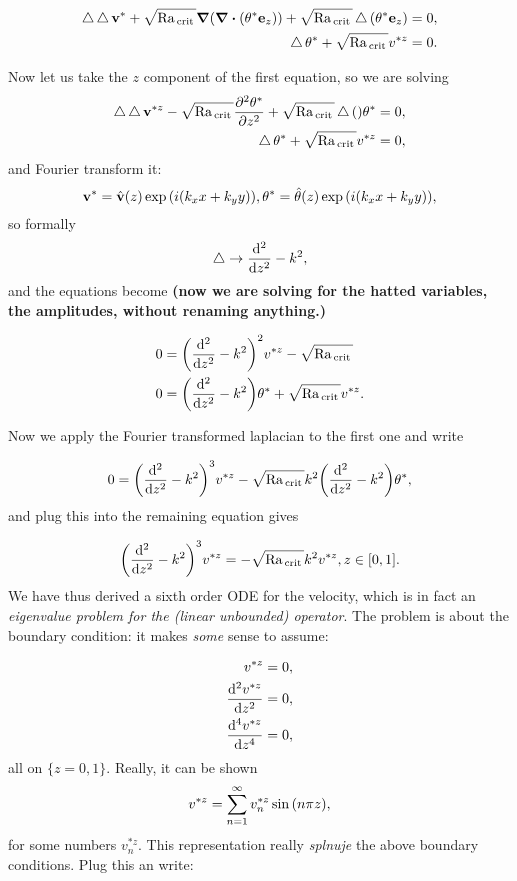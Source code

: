 \documentclass[reqno, a4paper]{article}
\begin{document}
\begin{align*}
	\laplace \laplace \vb{v}^{*} + \sqrt{\Rayleigh_{\, \text{crit} \,}}\grad \qty(\divergence{\qty(\theta^{*} \vb{e}_z)}) + \sqrt{\Rayleigh_{\, \text{crit} \,}}\laplace\qty(\theta^{*} \vb{e}_z) &= 0, \\
	\laplace \theta^{*} + \sqrt{\Rayleigh_{\, \text{crit} \,}} v^{*z} &= 0.
\end{align*}

Now let us take the $z$ component of the first equation, so we are solving
\begin{align*}
	\operatorname{\bigtriangleup} \operatorname{\bigtriangleup} \vb{v}^{*z} - \sqrt{\mathrm{Ra}_{\, \text{crit} \,}}\pdv[2]{\theta^{*}}{z}  + \sqrt{\mathrm{Ra}_{\, \text{crit} \,}}\operatorname{\bigtriangleup}\qty\theta^{*}  &= 0, \\
	\operatorname{\bigtriangleup} \theta^{*} + \sqrt{\mathrm{Ra}_{\, \text{crit} \,}} v^{*z} &= 0,
\end{align*}
and Fourier transform it:
\[
	\vb{v}^{*} = \hat{\vb{v}}(z) \exp\qty(i(k_x x + k_y y)), \theta^{*} = \hat{\theta}(z) \exp\qty(i(k_x x+ k_y y)),
\]
so formally
\[
	\operatorname{\bigtriangleup} \to \dv[2]{z} - k^{2},
\]
and the equations become \textbf{(now we are solving for the hatted variables, the amplitudes, without renaming anything.)}

\begin{align}
\label{eq:eqn_transformed}
0 &= \qty(\dv[2]{z}-k^{2})^{2} v^{*z} - \sqrt{\mathrm{Ra}_{\, \text{crit} \,}} \\
		0 &= \qty(\dv[2]{z}-k^{2})\theta^{*} + \sqrt{\mathrm{Ra}_{\, \text{crit} \,}} v^{*z}.
\end{align}

Now we apply the Fourier transformed laplacian to the first one and write

\[
	0 = \qty(\dv[2]{z}-k^{2})^{3} v^{*z}- \sqrt{\mathrm{Ra}_{\, \text{crit} \,}} k^{2}\qty(\dv[2]{z}-k^{2})\theta^{*},
\]
and plug this into the remaining equation gives

\[
	\qty(\dv[2]{z}-k^{2})^{3} v^{*z} = - \sqrt{\mathrm{Ra}_{\, \text{crit} \,}}k^{2} v^{*z}, z \in [0,1].
\]
We have thus derived a sixth order ODE for the velocity, which is in fact an \textit{eigenvalue problem for the (linear unbounded) operator}. The problem is about the boundary condition: it makes \textit{some} sense to assume:

\begin{align*}
	v^{*z} &= 0, \\
	\dv[2]{v^{*z}}{z} &= 0,\\
	\dv[4]{v^{*z}}{z} &= 0,
\end{align*}
all on $\{z = 0,1\}.$ Really, it can be shown
\[
	v^{*z} = \sum_{n=1}^{\infty}v_n^{*z}\sin\qty(n \pi z),
\]
for some numbers $v_n^{*z}.$ This representation really \textit{splnuje} the above boundary conditions. Plug this an write:
\end{document}
